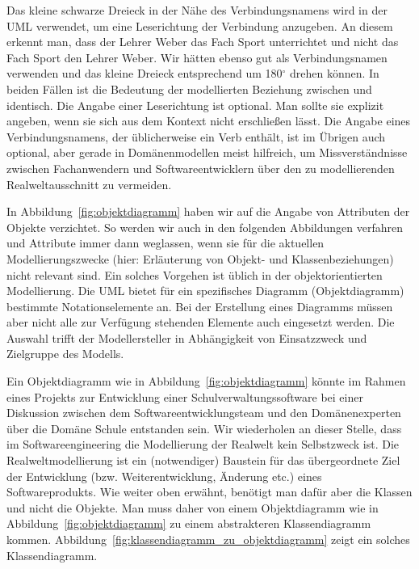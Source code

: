 Das kleine schwarze Dreieck in der Nähe des Verbindungsnamens wird in der UML verwendet, um eine Leserichtung der Verbindung anzugeben. An diesem erkennt man, dass der Lehrer Weber das Fach Sport unterrichtet und nicht das Fach Sport den Lehrer Weber. Wir hätten ebenso gut  als Verbindungsnamen verwenden und das kleine Dreieck entsprechend um 180$^{\circ}$ drehen können. In beiden Fällen ist die Bedeutung der modellierten Beziehung zwischen  und  identisch. Die Angabe einer Leserichtung ist optional. Man sollte sie explizit angeben, wenn sie sich aus dem Kontext nicht erschließen lässt. Die Angabe eines Verbindungsnamens, der üblicherweise ein Verb enthält, ist im Übrigen auch optional, aber gerade in Domänenmodellen meist hilfreich, um Missverständnisse zwischen Fachanwendern und Softwareentwicklern über den zu modellierenden Real\-welt\-ausschnitt zu vermeiden.

In Abbildung~\ref{fig:objektdiagramm} haben wir auf die Angabe von Attributen der Objekte verzichtet. So werden wir auch in den folgenden Abbildungen verfahren und Attribute immer dann weglassen, wenn sie für die aktuellen Modellierungszwecke (\zb hier: Erläuterung von Objekt- und Klassenbeziehungen) nicht relevant sind. Ein solches Vorgehen ist üblich in der objektorientierten Modellierung. Die UML bietet für ein spezifisches Diagramm (\zb Objektdiagramm) bestimmte Notationselemente an. Bei der Erstellung eines Diagramms müssen aber nicht alle zur Verfügung stehenden Elemente auch eingesetzt werden. Die Auswahl trifft der Modellersteller in Abhängigkeit von Einsatzzweck und Zielgruppe des Modells.

\vspace{2mm} %

\label{sec:Kap-3.2.5.3:klassenbeziehungen}

Ein Objektdiagramm wie in Abbildung~\ref{fig:objektdiagramm} könnte im Rahmen eines Projekts zur Entwicklung einer Schulverwaltungssoftware bei einer Diskussion zwischen dem Softwareentwicklungsteam und den Domänenexperten über die Domäne Schule entstanden sein. Wir wiederholen an dieser Stelle, dass im Softwareengineering die Modellierung der Realwelt kein Selbstzweck ist. Die Realweltmodellierung ist ein (notwendiger) Baustein für das übergeordnete Ziel der Entwicklung (bzw. Weiterentwicklung, Änderung etc.) eines Softwareprodukts. Wie weiter oben erwähnt, benötigt man dafür aber die Klassen und nicht die Objekte. Man muss daher von einem Objektdiagramm wie in Abbildung~\ref{fig:objektdiagramm} zu einem abstrakteren Klassendiagramm kommen. Abbildung~\ref{fig:klassendiagramm_zu_objektdiagramm} zeigt ein solches Klassendiagramm. 

